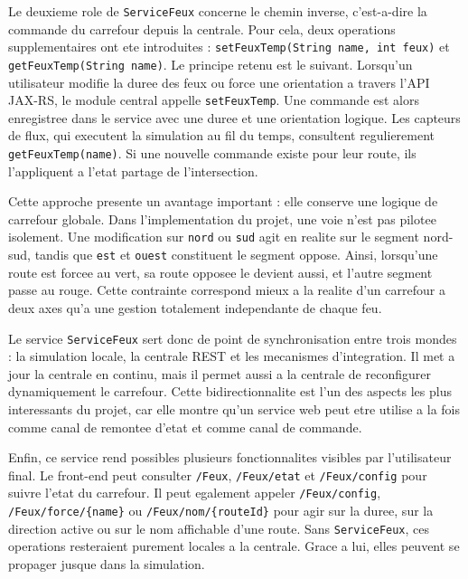 \documentclass[12pt,a4paper]{report}
\begin{document}
Le deuxieme role de \texttt{ServiceFeux} concerne le chemin inverse, c'est-a-dire la commande du carrefour depuis la centrale. Pour cela, deux operations supplementaires ont ete introduites : \texttt{setFeuxTemp(String name, int feux)} et \texttt{getFeuxTemp(String name)}. Le principe retenu est le suivant. Lorsqu'un utilisateur modifie la duree des feux ou force une orientation a travers l'API JAX-RS, le module central appelle \texttt{setFeuxTemp}. Une commande est alors enregistree dans le service avec une duree et une orientation logique. Les capteurs de flux, qui executent la simulation au fil du temps, consultent regulierement \texttt{getFeuxTemp(name)}. Si une nouvelle commande existe pour leur route, ils l'appliquent a l'etat partage de l'intersection.

Cette approche presente un avantage important : elle conserve une logique de carrefour globale. Dans l'implementation du projet, une voie n'est pas pilotee isolement. Une modification sur \texttt{nord} ou \texttt{sud} agit en realite sur le segment nord-sud, tandis que \texttt{est} et \texttt{ouest} constituent le segment oppose. Ainsi, lorsqu'une route est forcee au vert, sa route opposee le devient aussi, et l'autre segment passe au rouge. Cette contrainte correspond mieux a la realite d'un carrefour a deux axes qu'a une gestion totalement independante de chaque feu.

Le service \texttt{ServiceFeux} sert donc de point de synchronisation entre trois mondes : la simulation locale, la centrale REST et les mecanismes d'integration. Il met a jour la centrale en continu, mais il permet aussi a la centrale de reconfigurer dynamiquement le carrefour. Cette bidirectionnalite est l'un des aspects les plus interessants du projet, car elle montre qu'un service web peut etre utilise a la fois comme canal de remontee d'etat et comme canal de commande.

Enfin, ce service rend possibles plusieurs fonctionnalites visibles par l'utilisateur final. Le front-end peut consulter \texttt{/Feux}, \texttt{/Feux/etat} et \texttt{/Feux/config} pour suivre l'etat du carrefour. Il peut egalement appeler \texttt{/Feux/config}, \texttt{/Feux/force/\{name\}} ou \texttt{/Feux/nom/\{routeId\}} pour agir sur la duree, sur la direction active ou sur le nom affichable d'une route. Sans \texttt{ServiceFeux}, ces operations resteraient purement locales a la centrale. Grace a lui, elles peuvent se propager jusque dans la simulation.
\end{document}
